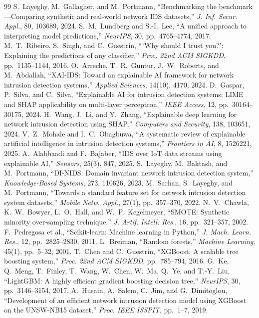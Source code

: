 \documentclass[11pt,a4paper]{article}
\begin{document}
\begin{thebibliography}{99}
 S.~Layeghy, M.~Gallagher, and M.~Portmann, ``Benchmarking the benchmark---Comparing synthetic and real-world network IDS datasets,'' \emph{J. Inf. Secur. Appl.}, 80, 103689, 2024.
 S.~M.~Lundberg and S.-I.~Lee, ``A unified approach to interpreting model predictions,'' \emph{NeurIPS}, 30, pp.~4765--4774, 2017.
 M.~T.~Ribeiro, S.~Singh, and C.~Guestrin, ```Why should I trust you?': Explaining the predictions of any classifier,'' \emph{Proc. 22nd ACM SIGKDD}, pp.~1135--1144, 2016.
 O.~Arreche, T.~R.~Guntur, J.~W.~Roberts, and M.~Abdallah, ``XAI-IDS: Toward an explainable AI framework for network intrusion detection systems,'' \emph{Applied Sciences}, 14(10), 4170, 2024.
 D.~Gaspar, P.~Silva, and C.~Silva, ``Explainable AI for intrusion detection systems: LIME and SHAP applicability on multi-layer perceptron,'' \emph{IEEE Access}, 12, pp.~30164--30175, 2024.
 H.~Wang, J.~Li, and Y.~Zhang, ``Explainable deep learning for network intrusion detection using SHAP,'' \emph{Computers and Security}, 138, 103651, 2024.
 V.~Z.~Mohale and I.~C.~Obagbuwa, ``A systematic review of explainable artificial intelligence in intrusion detection systems,'' \emph{Frontiers in AI}, 8, 1526221, 2025.
 A.~Alabbaadi and F.~Bajaber, ``IDS over IoT data streams using explainable AI,'' \emph{Sensors}, 25(3), 847, 2025.
 S.~Layeghy, M.~Baktash, and M.~Portmann, ``DI-NIDS: Domain invariant network intrusion detection system,'' \emph{Knowledge-Based Systems}, 273, 110626, 2023.
 M.~Sarhan, S.~Layeghy, and M.~Portmann, ``Towards a standard feature set for network intrusion detection system datasets,'' \emph{Mobile Netw. Appl.}, 27(1), pp.~357--370, 2022.
 N.~V.~Chawla, K.~W.~Bowyer, L.~O.~Hall, and W.~P.~Kegelmeyer, ``SMOTE: Synthetic minority over-sampling technique,'' \emph{J. Artif. Intell. Res.}, 16, pp.~321--357, 2002.
 F.~Pedregosa et al., ``Scikit-learn: Machine learning in Python,'' \emph{J. Mach. Learn. Res.}, 12, pp.~2825--2830, 2011.
 L.~Breiman, ``Random forests,'' \emph{Machine Learning}, 45(1), pp.~5--32, 2001.
 T.~Chen and C.~Guestrin, ``XGBoost: A scalable tree boosting system,'' \emph{Proc. 22nd ACM SIGKDD}, pp.~785--794, 2016.
 G.~Ke, Q.~Meng, T.~Finley, T.~Wang, W.~Chen, W.~Ma, Q.~Ye, and T.-Y.~Liu, ``LightGBM: A highly efficient gradient boosting decision tree,'' \emph{NeurIPS}, 30, pp.~3146--3154, 2017.
 A.~Husain, A.~Salem, C.~Jim, and G.~Dimitoglou, ``Development of an efficient network intrusion detection model using XGBoost on the UNSW-NB15 dataset,'' \emph{Proc. IEEE ISSPIT}, pp.~1--7, 2019.

\end{thebibliography}
\end{document}
